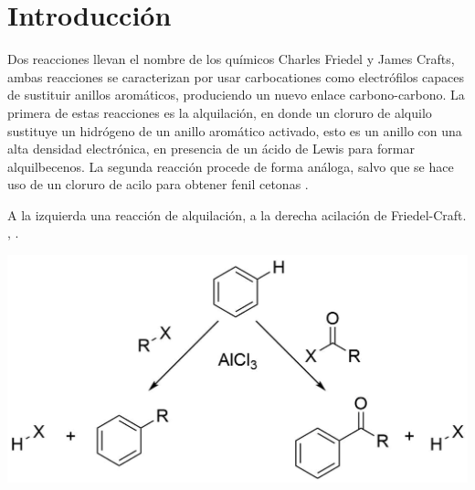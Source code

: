 \documentclass[fleqn,11pt]{SelfArx}
\begin{document}
\flushbottom %

\maketitle %


\thispagestyle{empty} %
\renewcommand{\tablename}{Tabla} 



\section*{Introducci\'on} %
Dos reacciones llevan el nombre de los químicos Charles Friedel y James Crafts, ambas reacciones se caracterizan por usar carbocationes como electrófilos capaces de sustituir anillos aromáticos, produciendo un nuevo enlace carbono-carbono. La primera de estas reacciones es la alquilación, en donde un cloruro de alquilo sustituye un hidrógeno de un anillo aromático activado, esto es un anillo con una alta densidad electrónica, en presencia de un ácido de Lewis para formar alquilbecenos. La segunda reacción procede de forma análoga, salvo que se hace uso de un cloruro de acilo para obtener fenil cetonas \cite{Wade2013}.
\begin{scheme}[h]
	\centering
	\caption{A la izquierda una reacción de alquilación, a la derecha acilación de Friedel-Craft. ,  \cite{Wade2013}.}
	\includegraphics[width=1.\linewidth]{structures/FriedelCraft.png}
\end{scheme}
\newpage
\end{document}
